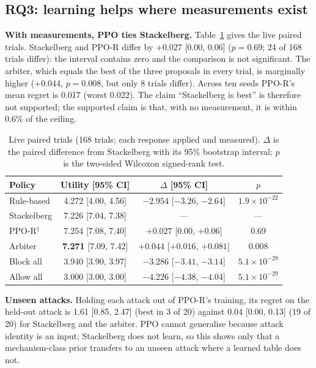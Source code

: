 \documentclass[conference]{IEEEtran}
\begin{document}
\subsection{RQ3: learning helps where measurements exist}
\label{sec:eval-rq3}
\textbf{With measurements, PPO ties Stackelberg.} Table~\ref{tab:live} gives the live paired trials. Stackelberg and PPO-R differ by $+0.027$ [0.00, 0.06] ($p=0.69$; 24 of 168 trials differ): the interval contains zero and the comparison is not significant. The arbiter, which equals the best of the three proposals in every trial, is marginally higher (+0.044, $p=0.008$, but only 8 trials differ). Across ten seeds PPO-R's mean regret is 0.017 (worst 0.022). The claim ``Stackelberg is best'' is therefore not supported; the supported claim is that, with no measurement, it is within 0.6\% of the ceiling.

\begin{table}[t]
\caption{Live paired trials (168 trials; each response applied and measured). $\Delta$ is the paired difference from Stackelberg with its 95\% bootstrap interval; $p$ is the two-sided Wilcoxon signed-rank test.}
\label{tab:live}
\centering
\scriptsize
\setlength{\tabcolsep}{2pt}
\begin{tabular}{@{}lccc@{}}
\toprule
Policy & Utility [95\% CI] & $\Delta$ [95\% CI] & $p$ \\
\midrule
Rule-based & 4.272 [4.00, 4.56] & $-2.954$ [$-3.26$, $-2.64$] & $1.9\times10^{-22}$ \\
Stackelberg & 7.226 [7.04, 7.38] & --- & --- \\
PPO-R$^{\dagger}$ & 7.254 [7.08, 7.40] & $+0.027$ [0.00, $+0.06$] & 0.69 \\
Arbiter & \textbf{7.271} [7.09, 7.42] & $+0.044$ [$+0.016$, $+0.081$] & 0.008 \\
Block all & 3.940 [3.90, 3.97] & $-3.286$ [$-3.41$, $-3.14$] & $5.1\times10^{-29}$ \\
Allow all & 3.000 [3.00, 3.00] & $-4.226$ [$-4.38$, $-4.04$] & $5.1\times10^{-29}$ \\
\bottomrule
\end{tabular}
\end{table}

\textbf{Unseen attacks.} Holding each attack out of PPO-R's training, its regret on the held-out attack is 1.61 [0.85, 2.47] (best in 3 of 20) against 0.04 [0.00, 0.13] (19 of 20) for Stackelberg and the arbiter. PPO cannot generalise because attack identity is an input; Stackelberg does not learn, so this shows only that a mechanism-class prior transfers to an unseen attack where a learned table does not.
\end{document}
